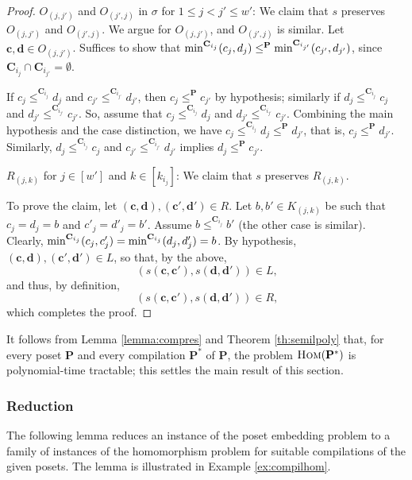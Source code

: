 \documentclass[usletter]{article}
\newcommand{\longversion}[1]{#1}
\newcommand{\cc}{\mathbf{C}}
\newcommand{\pp}{\mathbf{P}}
\begin{document}
{\begin{proof}
$O_{(j,j')}$ and $O_{(j',j)}$ in $\sigma$ for $1 \leq j < j' \leq w'$: 
We claim that $s$ preserves $O_{(j,j')}$ 
and $O_{(j',j)}$.  We argue for $O_{(j,j')}$, 
and $O_{(j',j)}$ is similar.  Let $\mathbf{c},\mathbf{d} \in O_{(j,j')}$.  
Suffices to show that $\textup{min}^{\cc_{i_j}}(c_j,d_j) \leq^{\pp} \textup{min}^{\cc_{i_{j'}}}(c_{j'},d_{j'})$, 
since $\cc_{i_j} \cap \cc_{i_{j'}}=\emptyset$.  

If $c_{j} \leq^{\cc_{i_j}} d_{j}$ and $c_{j'} \leq^{\cc_{i_{j'}}} d_{j'}$, 
then $c_{j} \leq^\pp c_{j'}$ by hypothesis; similarly 
if $d_{j} \leq^{\cc_{i_j}} c_{j}$ and $d_{j'} \leq^{\cc_{i_{j'}}} c_{j'}$.  
So, assume that $c_{j} \leq^{\cc_{i_j}} d_{j}$ and $d_{j'} \leq^{\cc_{i_{j'}}} c_{j'}$.  
Combining the main hypothesis and the case distinction, 
we have $c_{j} \leq^{\cc_{i_j}} d_{j} \leq^{\pp} d_{j'}$, 
that is, $c_{j} \leq^{\pp} d_{j'}$.  
Similarly, $d_{j} \leq^{\cc_{i_j}} c_{j}$ and $c_{j'} \leq^{\cc_{i_{j'}}} d_{j'}$ 
implies $d_{j} \leq^{\pp} c_{j'}$.  

$R_{(j,k)}$ for $j \in [w']$ and $k \in [k_{i_j}]$: 
We claim that $s$ preserves $R_{(j,k)}$.  

To prove the claim, let 
$(\mathbf{c},\mathbf{d}),(\mathbf{c}',\mathbf{d}') \in R$. 
Let $b,b' \in K_{(j,k)}$ be such that $c_{j}=d_{j}=b$ and $c'_{j}=d'_{j}=b'$.  
Assume $b \leq^{\cc_{i_j}} b'$ (the other case is similar).  Clearly, 
$\textup{min}^{\cc_{i_j}}(c_{j},c'_{j})=\textup{min}^{\cc_{i_{j}}}(d_{j},d'_{j})=b$.  
By hypothesis, $(\mathbf{c},\mathbf{d}),(\mathbf{c}',\mathbf{d}') \in L$, 
so that, by the above, $$(s(\mathbf{c},\mathbf{c}'), 
s(\mathbf{d},\mathbf{d}')) \in L\text{,}$$ 
and thus, by definition, 
$$(s(\mathbf{c},\mathbf{c}'), 
s(\mathbf{d},\mathbf{d}')) \in R\text{,}$$ 
which completes the proof.
\end{proof} 
}

\longversion{\pfcompres}

It follows from Lemma \ref{lemma:compres} and Theorem \ref{th:semilpoly} 
that, for every poset $\mathbf{P}$ and every compilation $\mathbf{P}^*$ of $\mathbf{P}$, 
the problem $\textsc{Hom}(\mathbf{P}^*)$ is polynomial-time tractable; 
this settles the main result of this section.



\subsubsection{Reduction}\label{sect:reduction}
The following lemma reduces an instance of the poset embedding problem 
to a family of instances of the homomorphism problem for suitable compilations of the given posets.  
The lemma is illustrated in Example \ref{ex:compilhom}.
\end{document}
